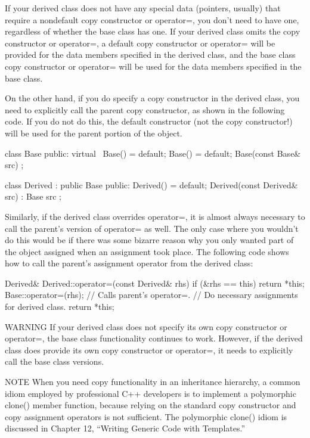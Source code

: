 If your derived class does not have any special data (pointers, usually) that require a nondefault copy constructor or operator=, you don’t need to have one, regardless of whether the base class has one. If your derived class omits the copy constructor or operator=, a default copy constructor or operator= will be provided for the data members specified in the derived class, and the base class copy constructor or operator= will be used for the data members specified in the base class.

On the other hand, if you do specify a copy constructor in the derived class, you need to explicitly call the parent copy constructor, as shown in the following code. If you do not do this, the default constructor (not the copy constructor!) will be used for the parent portion of the object.

\begin{cpp}
class Base
{
    public:
        virtual ~Base() = default;
        Base() = default;
        Base(const Base& src) { }
};

class Derived : public Base
{
    public:
        Derived() = default;
        Derived(const Derived& src) : Base { src } { }
};
\end{cpp}

Similarly, if the derived class overrides operator=, it is almost always necessary to call the parent’s version of operator= as well. The only case where you wouldn’t do this would be if there was some bizarre reason why you only wanted part of the object assigned when an assignment took place. The following code shows how to call the parent’s assignment operator from the derived class:

\begin{cpp}
Derived& Derived::operator=(const Derived& rhs)
{
    if (&rhs == this) { return *this; }
    Base::operator=(rhs); // Calls parent's operator=.
    // Do necessary assignments for derived class.
    return *this;
}
\end{cpp}

\begin{myWarning}{WARNING}
If your derived class does not specify its own copy constructor or operator=, the base class functionality continues to work. However, if the derived class does provide its own copy constructor or operator=, it needs to explicitly call the base class versions.
\end{myWarning}


\begin{myNotic}{NOTE}
When you need copy functionality in an inheritance hierarchy, a common idiom employed by professional C++ developers is to implement a polymorphic clone() member function, because relying on the standard copy constructor and copy assignment operators is not sufficient. The polymorphic clone() idiom is discussed in Chapter 12, “Writing Generic Code with Templates.”
\end{myNotic}

